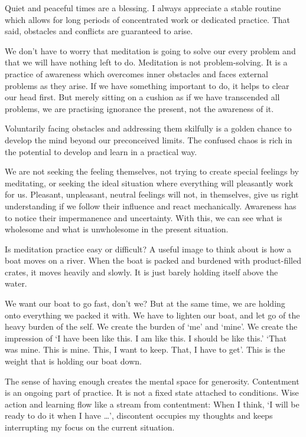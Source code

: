 \clearpage
\normalpagelayout

Quiet and peaceful times are a blessing. I always appreciate a stable
routine which allows for long periods of concentrated work or dedicated
practice. That said, obstacles and conflicts are guaranteed to arise.

We don't have to worry that meditation is going to solve our every
problem and that we will have nothing left to do. Meditation is not
problem-solving. It is a practice of awareness which overcomes inner
obstacles and faces external problems as they arise. If we have
something important to do, it helps to clear our head first. But merely
sitting on a cushion as if we have transcended all problems, we are
practising ignorance the present, not the awareness of it.

Voluntarily facing obstacles and addressing them skilfully is a golden
chance to develop the mind beyond our preconceived limits. The confused
chaos is rich in the potential to develop and learn in a practical way.

We are not seeking the feeling themselves, not trying to create special
feelings by meditating, or seeking the ideal situation where everything
will pleasantly work for us. Pleasant, unpleasant, neutral feelings will
not, in themselves, give us right understanding if we follow their
influence and react mechanically. Awareness has to notice their
impermanence and uncertainty. With this, we can see what is wholesome
and what is unwholesome in the present situation.

\enlargethispage*{\baselineskip}


Is meditation practice easy or difficult? A useful image to think about
is how a boat moves on a river. When the boat is packed and burdened
with product-filled crates, it moves heavily and slowly. It is just
barely holding itself above the water.

We want our boat to go fast, don't we? But at the same time, we are
holding onto everything we packed it with. We have to lighten our boat,
and let go of the heavy burden of the self. We create the burden of `me'
and `mine'. We create the impression of `I have been like this. I am
like this. I should be like this.' `That was mine. This is mine. This, I
want to keep. That, I have to get'. This is the weight that is holding
our boat down.

The sense of having enough creates the mental space for generosity.
Contentment is an ongoing part of practice. It is not a fixed state
attached to conditions. Wise action and learning flow like a stream from
contentment: When I think, `I will be ready to do it when I have
\ldots{}', discontent occupies my thoughts and keeps interrupting my
focus on the current situation.


